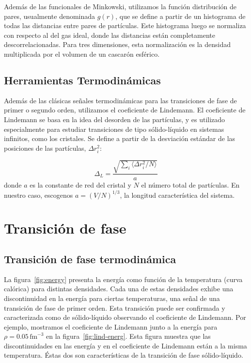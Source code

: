 Además de las funcionales de Minkowski, utilizamos la función distribución de pares, usualmente denominada $g(r)$, que se define a partir de un histograma de todas las distancias entre pares de partículas.
Este histograma luego se normaliza con respecto al del gas ideal, donde las distancias están completamente descorrelacionadas.
Para tres dimensiones, esta normalización es la densidad multiplicada por el volumen de un cascarón esférico.

\subsection{Herramientas Termodinámicas}

Además de las clásicas señales termodinámicas para las transiciones de fase de primer o segundo orden, utilizamos el coeficiente de Lindemann.
El coeficiente de Lindemann se basa en la idea del desorden de las partículas, y es utilizado especialmente para estudiar transiciones de tipo sólido-líquido en sistemas infinitos, como los cristales.
Se define a partir de la desviación estándar de las posiciones de las partículas, $\Delta
r_i^2$:

\begin{equation*}
\Delta_L = \frac{\sqrt{\sum_i\langle\Delta r_i^2/N\rangle}}{a}
\end{equation*}
donde $a$ es la constante de red del cristal y $N$ el número total de partículas.
En nuestro caso, escogenos $a=(V/N)^{1/3}$, la longitud característica del sistema.


\section{Transición de fase}\label{phase_transition}
\subsection{Transición de fase termodinámica}

La figura~\ref{fig:energy} presenta la energía como función de la temperatura (curva calórica) para distintas densidades.
Cada una de estas densidades exhibe una discontinuidad en la energía para ciertas temperaturas, una señal de una transición de fase de primer orden.
Esta transición puede ser confirmada y caracterizada como de sólido-líquido observando el coeficiente de Lindemann. Por ejemplo, mostramos el coeficiente de Lindemann junto a la energía para $\rho=0.05\,\text{fm}^{-3}$ en la figura~\ref{fig:lind-energ}.
Esta figura muestra que las discontinuidades en las energía y en el coeficiente de Lindemann están a la misma temperatura.
Éstas dos son características de la transición de fase sólido-líquido.

